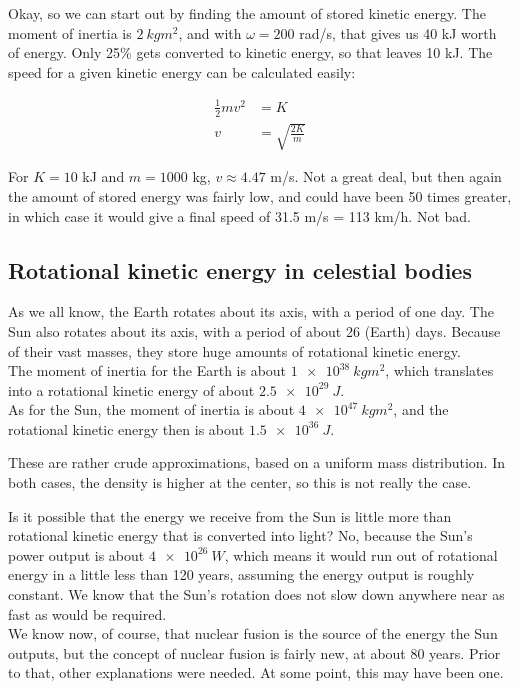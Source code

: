 \documentclass[12pt,a4paper]{report}
\begin{document}
Okay, so we can start out by finding the amount of stored kinetic energy. The moment of inertia is $\SI{2}{kg m^2}$, and with $\omega = 200$ rad/s, that gives us 40 kJ worth of energy. Only 25\% gets converted to kinetic energy, so that leaves 10 kJ. The speed for a given kinetic energy can be calculated easily:

\begin{align}
\frac{1}{2} m v^2 &= K\\
v &= \sqrt{\frac{2 K}{m}}
\end{align}

For $K = 10$ kJ and $m = 1000$ kg, $v \approx 4.47$ m/s. Not a great deal, but then again the amount of stored energy was fairly low, and could have been 50 times greater, in which case it would give a final speed of 31.5 m/s = 113 km/h. Not bad.

\subsection{Rotational kinetic energy in celestial bodies}

As we all know, the Earth rotates about its axis, with a period of one day. The Sun also rotates about its axis, with a period of about 26 (Earth) days. Because of their vast masses, they store huge amounts of rotational kinetic energy.\\
The moment of inertia for the Earth is about $\SI{1e38}{kg m^2}$, which translates into a rotational kinetic energy of about $\SI{2.5e29}{J}$.\\
As for the Sun, the moment of inertia is about $\SI{4e47}{kg m^2}$, and the rotational kinetic energy then is about $\SI{1.5e36}{J}$.

These are rather crude approximations, based on a uniform mass distribution. In both cases, the density is higher at the center, so this is not really the case.

Is it possible that the energy we receive from the Sun is little more than rotational kinetic energy that is converted into light? No, because the Sun's power output is about $\SI{4e26}{W}$, which means it would run out of rotational energy in a little less than 120 years, assuming the energy output is roughly constant. We know that the Sun's rotation does not slow down anywhere near as fast as would be required.\\
We know now, of course, that nuclear fusion is the source of the energy the Sun outputs, but the concept of nuclear fusion is fairly new, at about 80 years. Prior to that, other explanations were needed. At some point, this may have been one.
\end{document}
